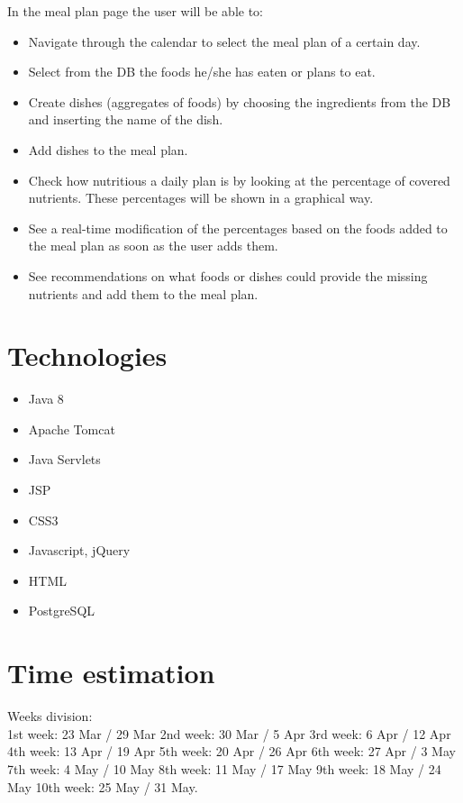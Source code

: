 \documentclass{article}
\begin{document}
In the meal plan page the user will be able to:
\begin{itemize}

  \item Navigate through the calendar to select the meal plan of a certain day.
  \item Select from the DB the foods he/she has eaten or plans to eat.
  \item Create dishes (aggregates of foods) by choosing the ingredients from the DB and inserting the name of the dish.
  \item Add dishes to the meal plan. 
  \item Check how nutritious a daily plan is by looking at the percentage of covered nutrients. These percentages will be shown in a graphical way.
  \item See a real-time modification of the percentages based on the foods added to the meal plan as soon as the user adds them.
  \item See recommendations on what foods or dishes could provide the missing nutrients and add them to the meal plan.
\end{itemize}


\section{Technologies}

\begin{itemize}

  \item Java 8
  \item Apache Tomcat
  \item Java Servlets
  \item JSP
  \item CSS3
  \item Javascript, jQuery
  \item HTML
  \item PostgreSQL
\end{itemize}
\clearpage


\section{Time estimation}
Weeks division:\\ 
1st week: 23 Mar / 29 Mar	\textperiodcentered 
2nd week: 30 Mar / 5 Apr	\textperiodcentered
3rd week: 6 Apr / 12 Apr	\textperiodcentered
4th week: 13 Apr / 19 Apr	\textperiodcentered
5th week: 20 Apr / 26 Apr	\textperiodcentered
6th week: 27 Apr / 3 May	\textperiodcentered
7th week: 4 May / 10 May	\textperiodcentered
8th week: 11 May / 17 May	\textperiodcentered
9th week: 18 May / 24 May	\textperiodcentered
10th week: 25 May / 31 May.\\
\end{document}

